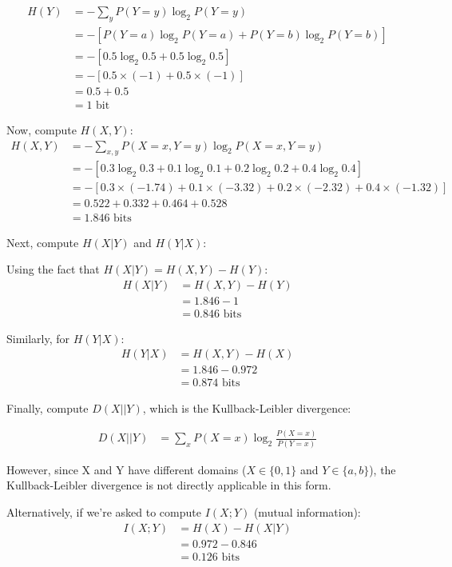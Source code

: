 \documentclass[a4paper,margin=1cm]{article}
\begin{document}
\begin{align*}
H(Y) &= -\sum_{y} P(Y=y) \log_2 P(Y=y)\\
&= -[P(Y=a) \log_2 P(Y=a) + P(Y=b) \log_2 P(Y=b)]\\
&= -[0.5 \log_2 0.5 + 0.5 \log_2 0.5]\\
&= -[0.5 \times (-1) + 0.5 \times (-1)]\\
&= 0.5 + 0.5\\
&= 1 \text{ bit}
\end{align*}

Now, compute $H(X,Y)$:
\begin{align*}
H(X,Y) &= -\sum_{x,y} P(X=x, Y=y) \log_2 P(X=x, Y=y)\\
&= -[0.3 \log_2 0.3 + 0.1 \log_2 0.1 + 0.2 \log_2 0.2 + 0.4 \log_2 0.4]\\
&= -[0.3 \times (-1.74) + 0.1 \times (-3.32) + 0.2 \times (-2.32) + 0.4 \times (-1.32)]\\
&= 0.522 + 0.332 + 0.464 + 0.528\\
&= 1.846 \text{ bits}
\end{align*}

Next, compute $H(X|Y)$ and $H(Y|X)$:

Using the fact that $H(X|Y) = H(X,Y) - H(Y)$:
\begin{align*}
H(X|Y) &= H(X,Y) - H(Y)\\
&= 1.846 - 1\\
&= 0.846 \text{ bits}
\end{align*}

Similarly, for $H(Y|X)$:
\begin{align*}
H(Y|X) &= H(X,Y) - H(X)\\
&= 1.846 - 0.972\\
&= 0.874 \text{ bits}
\end{align*}

Finally, compute $D(X||Y)$, which is the Kullback-Leibler divergence:

\begin{align*}
D(X||Y) &= \sum_{x} P(X=x) \log_2 \frac{P(X=x)}{P(Y=x)}
\end{align*}

However, since X and Y have different domains ($X \in \{0,1\}$ and $Y \in \{a,b\}$), the Kullback-Leibler divergence is not directly applicable in this form. 

Alternatively, if we're asked to compute $I(X;Y)$ (mutual information):
\begin{align*}
I(X;Y) &= H(X) - H(X|Y)\\
&= 0.972 - 0.846\\
&= 0.126 \text{ bits}
\end{align*}
\end{document}
